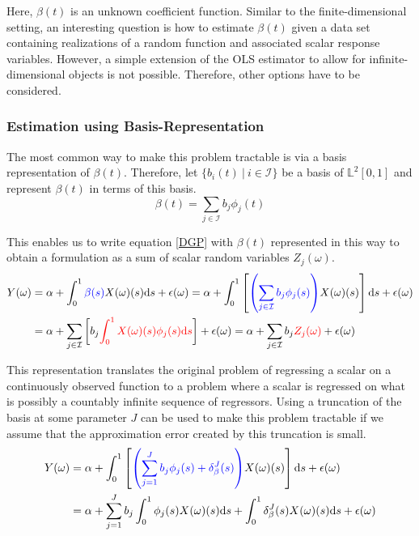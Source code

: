 \documentclass[11pt,twoside,a4paper]{article}
\begin{document}
	Here, $\beta(t)$ is an unknown coefficient function. Similar to the finite-dimensional setting, an interesting question is how to estimate $\beta(t)$ given a data set containing realizations of a random function and associated scalar response variables. However, a simple extension of the OLS estimator to allow for infinite-dimensional objects is not possible. Therefore, other options have to be considered.
	
	\subsubsection{Estimation using Basis-Representation}\label{basis_exp_transf}
	The most common way to make this problem tractable is via a basis representation of $\beta(t)$. Therefore, let $\{b_i(t) \: \vert \: i \in \mathcal{I}\}$ be a basis of $\mathbb{L}^2[0,1]$ and represent $\beta(t)$ in terms of this basis.
	\begin{equation}
		\beta(t) = \sum_{j \in \mathcal{I}} b_j \phi_j(t)
	\end{equation}
	
	This enables us to write equation \ref{DGP} with $\beta(t)$ represented in this way to obtain a formulation as a sum of scalar random variables $Z_j(\omega)$.
	\begin{equation}
		\begin{split}
			Y(\omega) & = \alpha + \int_{0}^{1} {\color{blue}\beta(s)} X(\omega)(s)\mathrm{d}s + \epsilon(\omega)
			= \alpha + \int_{0}^{1}\left[{\color{blue}\left(\sum_{j \in \mathcal{I}} b_j \phi_j(s)\right)} X(\omega)(s) \right]\mathrm{d}s + \epsilon(\omega) \\
			& = \alpha + \sum_{j \in \mathcal{I}} \left[b_j \textcolor{red}{\int_{0}^{1} X(\omega)(s) \phi_j(s)\mathrm{d}s}\right] + \epsilon(\omega)
		      = \alpha + \sum_{j \in \mathcal{I}} b_j \textcolor{red}{Z_j(\omega)} + \epsilon(\omega)
		\end{split}
	\end{equation}
	
	This representation translates the original problem of regressing a scalar on a continuously observed function to a problem where a scalar is regressed on what is possibly a countably infinite sequence of regressors. Using a truncation of the basis at some parameter $J$ can be used to make this problem tractable if we assume that the approximation error created by this truncation is small.
	\begin{equation}
		\begin{split}
			Y(\omega) & = \alpha + \int_{0}^{1}\left[{\color{blue}\left(\sum_{j = 1}^{J} b_j \phi_j(s) + \delta_{\beta}^{J}(s)\right)} X(\omega)(s) \right]\mathrm{d}s + \epsilon(\omega) \\
			& = \alpha + \sum_{j = 1}^{J} b_j \int_{0}^{1} \phi_j(s) X(\omega)(s) \mathrm{d}s +  \int_{0}^{1} \delta_{\beta}^{J}(s) X(\omega)(s) \mathrm{d}s + \epsilon(\omega)
		\end{split}
	\end{equation}
\end{document}
